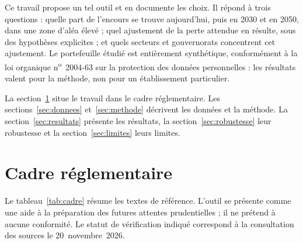 \documentclass[11pt,a4paper]{article}
\begin{document}
Ce travail propose un tel outil et en documente les choix. Il répond à trois questions : quelle part de l'encours se trouve aujourd'hui, puis en 2030 et en 2050, dans une zone d'aléa élevé ; quel ajustement de la perte attendue en résulte, sous des hypothèses explicites ; et quels secteurs et gouvernorats concentrent cet ajustement. Le portefeuille étudié est entièrement synthétique, conformément à la loi organique n\textsuperscript{o}~2004-63 sur la protection des données personnelles : les résultats valent pour la méthode, non pour un établissement particulier.

La section~\ref{sec:cadre} situe le travail dans le cadre réglementaire. Les sections~\ref{sec:donnees} et~\ref{sec:methode} décrivent les données et la méthode. La section~\ref{sec:resultats} présente les résultats, la section~\ref{sec:robustesse} leur robustesse et la section~\ref{sec:limites} leurs limites.

\section{Cadre réglementaire}\label{sec:cadre}

Le tableau~\ref{tab:cadre} résume les textes de référence. L'outil se présente comme une aide à la préparation des futures attentes prudentielles ; il ne prétend à aucune conformité. Le statut de vérification indiqué correspond à la consultation des sources le 20~novembre~2026.
\end{document}
